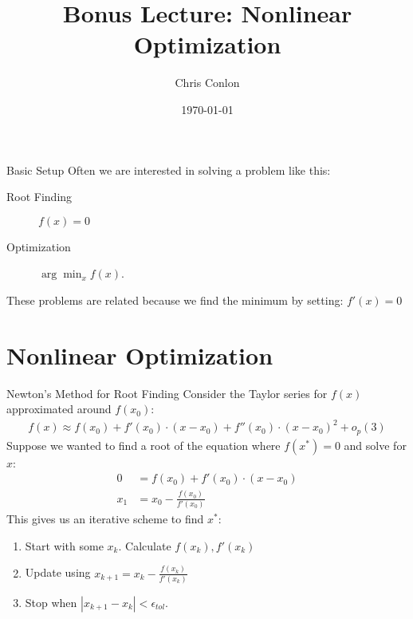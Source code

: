

\newcommand{\fp}{\frame[plain]}


\title{Bonus Lecture: Nonlinear Optimization}
\author{Chris Conlon  }
\date{\today }


\begin{frame}
\titlepage
\end{frame}

\begin{frame}{Basic Setup}
Often we are interested in solving a problem like this:
\begin{description}
\item[Root Finding] $f(x) = 0 $
\item[Optimization] $\arg \min_x f(x)$.
\end{description}
These problems are related because we find the minimum by setting: $f'(x)=0$
\end{frame}


\section{Nonlinear Optimization}
\begin{frame}{Newton's Method for Root Finding}
Consider the Taylor series for $f(x)$ approximated around $f(x_0)$:
\begin{align*}
f(x) \approx f(x_0) + f'(x_0) \cdot (x-x_0) + f''(x_0) \cdot (x-x_0)^2 + o_p(3)
\end{align*}
Suppose we wanted to find a \alert{root} of the equation where $f(x^{*})=0$ and solve for $x$:
\begin{align*}
0 &= f(x_0) + f'(x_0) \cdot (x-x_0) \\
x_1 &= x_0-\frac{f(x_0)}{f'(x_0)} 
\end{align*}
This gives us an \alert{iterative} scheme to find $x^{*}$:
\begin{enumerate}
\item Start with some $x_k$. Calculate $f(x_k),f'(x_k)$
\item Update using $x_{k+1} = x_k - \frac{f(x_k)}{f'(x_k)} $
\item Stop when $|x_{k+1}-x_{k}| < \epsilon_{tol}$.
\end{enumerate}
\end{frame}


